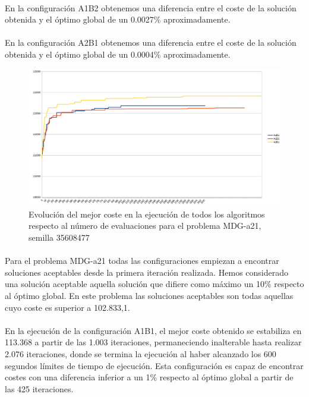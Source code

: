 	\paragraph{}En la configuración A1B2 obtenemos una diferencia entre el coste de la solución obtenida y el óptimo global de un 0.0027\% aproximadamente.
	
	\paragraph{}En la configuración A2B1 obtenemos una diferencia entre el coste de la solución obtenida y el óptimo global de un 0.0004\% aproximadamente.

	\begin{figure}[H]
		\centering
		\includegraphics[scale=0.3]{img/MDG1conver.png}
		\caption{Evolución del mejor coste en la ejecución de todos los algoritmos respecto al número de evaluaciones para el problema MDG-a21, semilla 35608477}
		\label{MDG-a_21_historico}
	\end{figure}

	\paragraph{}Para el problema MDG-a21 todas las configuraciones empiezan a encontrar soluciones aceptables desde la primera iteración realizada. Hemos considerado una solución aceptable aquella solución que difiere como máximo un 10\% respecto al óptimo global. En este problema las soluciones aceptables son todas aquellas cuyo coste es superior a 102.833,1.
	
	\paragraph{}En la ejecución de la configuración A1B1, el mejor coste obtenido se estabiliza en 113.368 a partir de las 1.003 iteraciones, permaneciendo inalterable hasta realizar 2.076 iteraciones, donde se termina la ejecución al haber alcanzado los 600 segundos límites de tiempo de ejecución. Esta configuración es capaz de encontrar costes con una diferencia inferior a un 1\% respecto al óptimo global a partir de las 425 iteraciones.
	
